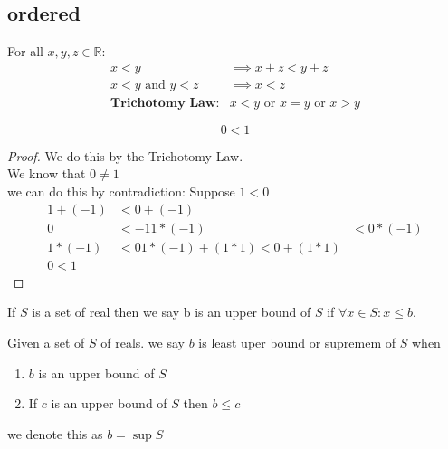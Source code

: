 \documentclass[answers,12pt,addpoints]{exam}
\begin{document}
\subsection{ordered}
For all $x,y,z \in \mathbb{R}$:
\begin{align*}
    x<y &\implies x+z < y+z\\
    x<y \text{ and } y < z &\implies x < z\\
    \textbf{Trichotomy Law:} &x<y \text{ or } x=y \text{ or } x>y
\end{align*}
\begin{theorem}
    $$ 0 < 1$$
    \begin{proof}
        We do this by the Trichotomy Law. \\
        We know that $0 \neq 1$ \\
        we can do this by contradiction: Suppose $1 < 0$
        \begin{align*}
            1+(-1) &< 0+(-1)\\
            0 &< -1
            1*(-1) &< 0*(-1)\\
            1*(-1) &< 0 
            1*(-1) + (1*1) < 0 + (1*1)\\
            0 < 1
        \end{align*}
    \end{proof}
\end{theorem}
\begin{definition}
    If $S$ is a set of real then we say b is an upper bound of $S$ if $\forall x \in S: x \leq b$.
\end{definition}
\begin{definition}
    Given a set of $S$ of reals. we say $b$ is least uper bound or supremem of $S$ when 
    \begin{enumerate}
        \item $b$ is an upper bound of $S$
        \item If $c$ is an upper bound of $S$ then $b \leq c$
    \end{enumerate}
    we denote this as $b = \sup S$
\end{definition}
\end{document}

